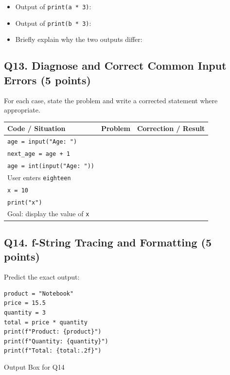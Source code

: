 \documentclass[11pt,a4paper]{article}
\begin{document}
\begin{itemize}[leftmargin=2em]
  \item Output of \texttt{print(a * 3)}: \underline{\hspace{5cm}}
  \item Output of \texttt{print(b * 3)}: \underline{\hspace{5cm}}
  \item Briefly explain why the two outputs differ: \hrulefill
\end{itemize}

\subsection*{Q13. Diagnose and Correct Common Input Errors (5 points)}
For each case, state the problem and write a corrected statement where appropriate.

\renewcommand{\arraystretch}{1.35}
\begin{tabularx}{\textwidth}{|p{4.9cm}|X|X|}
\hline
\textbf{Code / Situation} & \textbf{Problem} & \textbf{Correction / Result} \\
\hline
\texttt{age = input("Age: ")}\\
\texttt{next\_age = age + 1} & & \\[4mm]
\hline
\texttt{age = int(input("Age: "))}\\
User enters \texttt{eighteen} & & \\[4mm]
\hline
\texttt{x = 10}\\
\texttt{print("x")}\\
Goal: display the value of \texttt{x} & & \\[4mm]
\hline
\end{tabularx}

\subsection*{Q14. f-String Tracing and Formatting (5 points)}
Predict the exact output:

\begin{lstlisting}
product = "Notebook"
price = 15.5
quantity = 3
total = price * quantity
print(f"Product: {product}")
print(f"Quantity: {quantity}")
print(f"Total: {total:.2f}")
\end{lstlisting}

\begin{answerbox}[height=2.35cm]{Output Box for Q14}
\end{answerbox}
\end{document}
